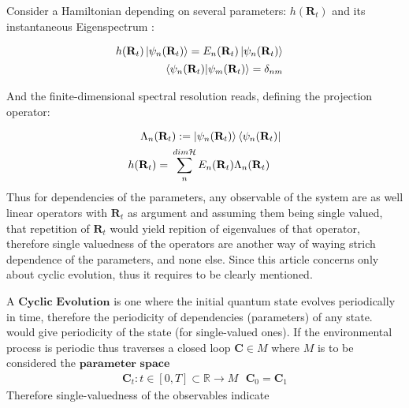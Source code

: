 \documentclass[8pt, twocoloumn]{article}
\begin{document}
Consider a Hamiltonian depending on several parameters: $h(\textbf{R}_t)$ and its instantaneous Eigenspectrum :

\begin{align}{\label{eigenstate}}
\begin{split}
    h(\textbf{R}_t) \ket{\psi_n (\textbf{R}_t)} ={}& E_n(\textbf{R}_t) \ket{\psi_n (\textbf{R}_t)} \notag
\end{split}\\
\begin{split}
    \braket{\psi_n (\textbf{R}_t)| \psi_m (\textbf{R}_t)} ={}& \delta_{nm}
\end{split}
\end{align}

And the finite-dimensional spectral resolution reads, defining the projection operator: 

\begin{align}
\begin{split}
\Lambda_n(\textbf{R}_t):= \ket{\psi_n(\textbf{R}_t)}\bra{\psi_n(\textbf{R}_t)} 
\end{split}\\
\begin{split}
h(\textbf{R}_t)={}& \sum_{n}^{dim\mathcal{H}} E_n(\textbf{R}_t)\Lambda_n(\textbf{R}_t) 
\end{split}
\end{align}
Thus for dependencies of the parameters, any observable of the system are as well linear operators with $\textbf{R}_t$ as argument and assuming them being single valued, that repetition of $\textbf{R}_t$ would yield repition of eigenvalues of that operator, therefore single valuedness of the operators are another way of waying strich dependence of the parameters, and none else.
Since this article concerns only about cyclic evolution, thus it requires to be clearly mentioned. 

A $\textbf{Cyclic Evolution}$ is one where the initial quantum state evolves periodically in time, therefore the periodicity of dependencies (parameters) of any state. would give periodicity of the state (for single-valued ones). If the environmental process is periodic thus traverses a closed loop $\textbf{C} \in M$ where $M$ is to be considered the $\textbf{parameter space}$
\begin{align}
\textbf{C}_t: t \in [0,T] \subset \mathbb{R} \to M \ \ \ \textbf{C}_0=\textbf{C}_1
\end{align}
Therefore single-valuedness of the observables indicate 
\end{document}
